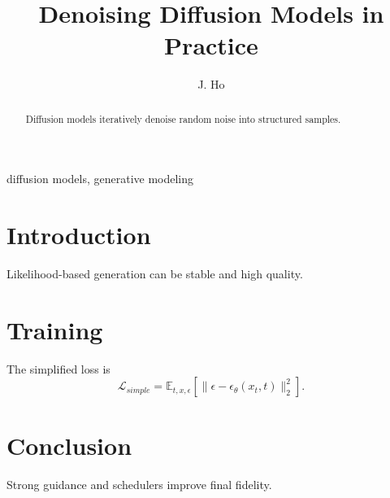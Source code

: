 \documentclass[conference]{IEEEtran}
\affiliation{\institution{Open Research Lab}\country{USA}}
\begin{document}
\title{Denoising Diffusion Models in Practice}
\author{J. Ho}
\maketitle
\begin{abstract}
Diffusion models iteratively denoise random noise into structured samples.
\end{abstract}
\begin{IEEEkeywords}
diffusion models, generative modeling
\end{IEEEkeywords}
\IEEEoverridecommandlockouts
\section{Introduction}
Likelihood-based generation can be stable and high quality.

\FloatBarrier
\section{Training}
The simplified loss is
\begin{equation}
\mathcal{L}_{simple}=\mathbb{E}_{t,x,\epsilon}\left[\|\epsilon-\epsilon_\theta(x_t,t)\|_2^2\right].
\end{equation}

\FloatBarrier
\section{Conclusion}
Strong guidance and schedulers improve final fidelity.

\FloatBarrier


\end{document}
